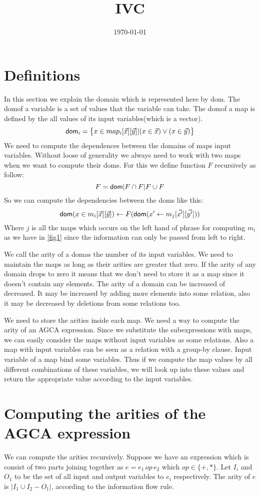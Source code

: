 \documentclass[12pt]{article}
\begin{document}
\title{IVC}
\author{}
\date{\today}
\maketitle
\newcommand{\dom}{\textsf{dom}}
\section{Definitions}
In this section we explain the domain which is represented here by \dom. The \dom of a variable is a set of values that the variable can take. The \dom of a map is defined by the all values of its input variables(which is a vector). 
\begin{equation*}
\text{\dom}_{i}=  \big\{x\in map_{i}[\vec{x}][\vec{y}]| (x\in \vec{x})\lor(x\in \vec{y})\big\}
\end{equation*}
We need to compute the dependences between the domains of maps input variables. Without loose of generality  we always need to work with two maps when we want to compute their \dom s. For this we define function $F$ recursively as follow:
\begin{equation*}
F=\text{\dom}|F\cap F|F\cup F
\end{equation*}
So we can compute the dependencies between the \dom s like this:
\begin{equation*}
\text{\dom}(x\in m_{i}[\vec{x}][\vec{y}])\gets F(\text{\dom}(x'\gets m_{j}[\vec{x'}][\vec{y'}]))
\end{equation*}
Where $j$ is all the maps which occurs on the left hand of phrase for computing $m_{i}$ as we have in \ref{fig1} since the information can only be passed from left to right. \par
We call the arity of a \dom as the number of its input variables. We need to maintain the maps as long as their arities are greater that zero. If the arity of any domain drops to zero it means that we don't need to store it as a map since it doesn't contain any elements. The arity of a domain can be increased of decreased. It may be increased by adding more elements into some relation, also it may be decreased by deletions from some relations too. \\
\par
We need to store the arities inside each map. We need a way to compute the arity of an AGCA expression. Since we substitute the subexpressions with maps, we can easily consider the maps without input variables as some relations. Also a map with input variables can be seen as a relation with a group-by clause. Input variable of a map bind some variables. Thus if we compute the map values by all different combinations of these variables, we will look up into these values and return the appropriate value according to the input variables.  
\section{Computing the arities of the AGCA expression}
We can compute the arities recursively. Suppose we have an expression which is consist of two parts joining together as $e=e_{1}\,op\, e_{2}$ which $op\in\{+,*\}$. Let $I_{i}$ and $O_{1}$ to be the set of all input and output variables to $e_{i}$ respectively. The arity of $e$ is $|I_{1}\cup I_{2}-O_{1}|$, according to the information flow rule. 
\end{document}
